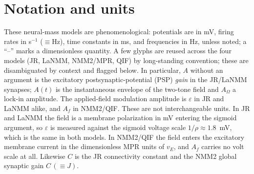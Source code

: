 \documentclass[11pt,a4paper]{article}
\newif\ifappendices
\begin{document}



\fi
\ifappendices
\clearpage
\appendix
\renewcommand{\thefigure}{S\arabic{figure}}
\setcounter{figure}{0}
\makeatletter
\let\ne@stdsection\section
\renewcommand{\section}{\clearpage\ne@stdsection}
\makeatother

\section{Notation and units}\label{app:notation}
These neural-mass models are phenomenological: potentials are in mV, firing rates in
s$^{-1}$ ($\equiv$Hz), time constants in ms, and frequencies in Hz, unless noted; a
``--'' marks a dimensionless quantity. A few glyphs are reused across the four models
(JR, LaNMM, NMM2/MPR, QIF) by long-standing convention; these are disambiguated by
context and flagged below. In particular, $A$ without an argument is the excitatory postsynaptic-potential (PSP) \emph{gain} in the
JR/LaNMM synapses; $A(t)$ is the instantaneous envelope of the two-tone field and
$A_\Omega$ a lock-in amplitude. The applied-field modulation amplitude is
$\varepsilon$ in JR and LaNMM alike, and $A_f$ in NMM2/QIF. These are not
interchangeable units. In JR and LaNMM the field is a membrane polarization in mV
entering the sigmoid argument, so $\varepsilon$ is measured against the sigmoid voltage
scale $1/\rho\approx1.8$~mV, which is the same in both models. In NMM2/QIF the field
enters the excitatory membrane current in the dimensionless MPR units of $v_E$, and
$A_f$ carries no volt scale at all. Likewise $C$ is the JR connectivity constant and the
NMM2 global synaptic gain $C\,(\equiv J)$.
\end{document}
